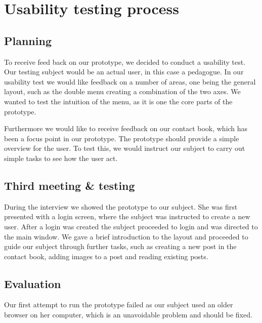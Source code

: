 \section{Usability testing process}

\subsection{Planning}

To receive feed back on our prototype, we decided to conduct a usability test. Our testing subject would be an actual user, in this case a pedagogue. In our usability test we would like feedback on a number of areas, one being the general layout, such as the double menu creating a combination of the two axes. We wanted to test the intuition of the menu, as it is one the core parts of the prototype. 
 
Furthermore we would like to receive feedback on our contact book, which has been a focus point in our prototype. The prototype should provide a simple overview for the user. To test this, we would instruct our subject to carry out simple tasks to see how the user act.


\subsection{Third meeting \& testing}

During the interview we showed the prototype to our subject. She was first presented with a login screen, where the subject was instructed to create a new user. After a login was created the subject proceeded to login and was directed to the main window. We gave a brief introduction to the layout and proceeded to guide our subject through further tasks, such as creating a new post in the contact book, adding images to a post and reading existing posts. 


\subsection{Evaluation}
Our first attempt to run the prototype failed as our subject used an older browser on her computer, which is an unavoidable problem and should be fixed.

